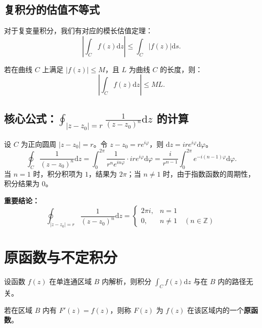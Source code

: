 \subsection{复积分的估值不等式}
对于复变量积分，我们有对应的模长估值定理：
\[
\left| \int_C f(z) \mathrm{d}z \right| \le \int_C |f(z)| \mathrm{d}s.
\]
\begin{tcolorbox}[colframe=teal!60!black, colback=teal!5!white, leftrule=3pt, rightrule=0pt, toprule=0pt, bottomrule=0pt, sharp corners]
	若在曲线 $C$ 上满足 $|f(z)| \le M$，且 $L$ 为曲线 $C$ 的长度，则：
	\[
	\left| \int_C f(z) \mathrm{d}z \right| \le M L.
	\]
\end{tcolorbox}

\subsection{核心公式：$\displaystyle \oint_{|z-z_0|=r} \frac{1}{(z-z_0)^n} \mathrm{d}z$ 的计算}
设 $C$ 为正向圆周 $|z-z_0|=r$。令 $z-z_0 = re^{i\varphi}$，则 $\mathrm{d}z = ire^{i\varphi} \mathrm{d}\varphi$。
\[
\oint_C \frac{1}{(z-z_0)^n} \mathrm{d}z = \int_0^{2\pi} \frac{1}{r^n e^{in\varphi}} \cdot ire^{i\varphi} \mathrm{d}\varphi = \frac{i}{r^{n-1}} \int_0^{2\pi} e^{-i(n-1)\varphi} \mathrm{d}\varphi.
\]
当 $n=1$ 时，积分积项为 $1$，结果为 $2\pi$；当 $n \neq 1$ 时，由于指数函数的周期性，积分结果为 $0$。

\begin{tcolorbox}[colframe=purple!50!black, colback=purple!5!white, sharp corners]
	\textbf{重要结论：}
	\[
	\oint_{|z-z_0|=r} \frac{1}{(z-z_0)^n} \mathrm{d}z =
	\begin{cases}
		2\pi i, & n=1 \\
		0, & n \neq 1 \quad (n \in \mathbb{Z})
	\end{cases}
	\]
\end{tcolorbox}

\section{原函数与不定积分}

\begin{tcolorbox}[title=定理：积分与路径无关性, colframe=green!45!black, colback=green!5!white]
	设函数 $f(z)$ 在单连通区域 $B$ 内解析，则积分 $\displaystyle \int_C f(z) \mathrm{d}z$ 与在 $B$ 内的路径无关。
\end{tcolorbox}

\begin{tcolorbox}[title=定义：原函数, colframe=blue!50!black, colback=blue!5!white, sharp corners]
	若在区域 $B$ 内有 $F'(z) = f(z)$，则称 $F(z)$ 为 $f(z)$ 在该区域内的一个\textbf{原函数}。
\end{tcolorbox}


